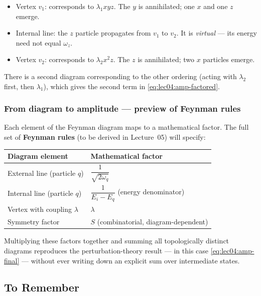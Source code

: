 \begin{itemize}
  \item Vertex $v_1$: corresponds to $\lambda_1 xyz$.  The $y$ is annihilated; one $x$ and one $z$ emerge.
  \item Internal line: the $z$ particle propagates from $v_1$ to $v_2$.  It is \emph{virtual} — its energy need not equal $\omega_z$.
  \item Vertex $v_2$: corresponds to $\lambda_2 x^2 z$.  The $z$ is annihilated; two $x$ particles emerge.
\end{itemize}

There is a second diagram corresponding to the other ordering (acting with $\lambda_2$ first, then $\lambda_1$), which gives the second term in \eqref{eq:lec04:amp-factored}.

\subsubsection*{From diagram to amplitude — preview of Feynman rules}

Each element of the Feynman diagram maps to a mathematical factor.  The full set of \textbf{Feynman rules} (to be derived in Lecture~05) will specify:
\begin{center}
\begin{tabular}{ll}
  \toprule
  Diagram element & Mathematical factor \\
  \midrule
  External line (particle $q$) & $\dfrac{1}{\sqrt{2\omega_q}}$ \\[8pt]
  Internal line (particle $q$) & $\dfrac{1}{E_i - E_q}$ (energy denominator) \\[8pt]
  Vertex with coupling $\lambda$ & $\lambda$ \\[4pt]
  Symmetry factor & $S$ (combinatorial, diagram-dependent) \\
  \bottomrule
\end{tabular}
\end{center}

Multiplying these factors together and summing all topologically distinct diagrams reproduces the perturbation-theory result — in this case \eqref{eq:lec04:amp-final} — without ever writing down an explicit sum over intermediate states.

\subsection*{To Remember}

